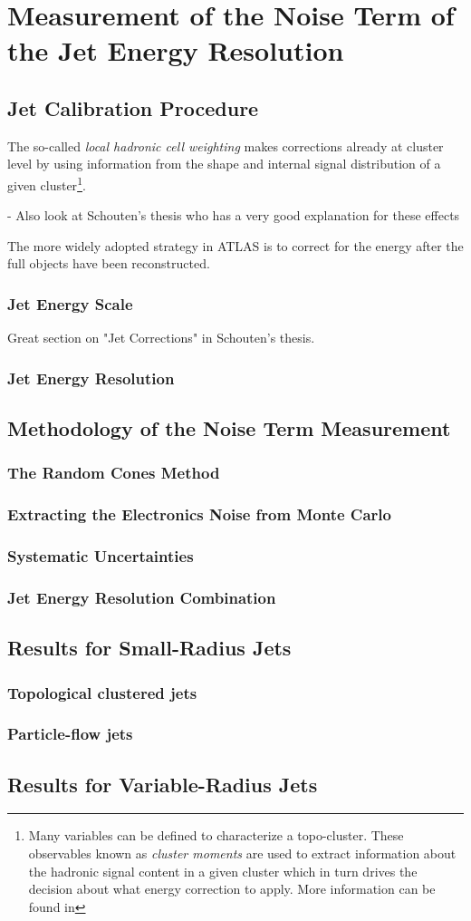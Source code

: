 \chapter{Measurement of the Noise Term of the Jet Energy Resolution}
\label{chap:calibration}

\section{Jet Calibration Procedure}
The so-called \emph{local hadronic cell weighting} makes corrections already at cluster level by using information from the shape and internal signal distribution of a given cluster\footnote{Many variables can be defined to characterize a topo-cluster. These observables known as \emph{cluster moments} are used to extract information about the hadronic signal content in a given cluster which in turn drives the decision about what energy correction to apply. More information can be found in }.

- Also look at Schouten's thesis who has a very good explanation for these effects

The more widely adopted strategy in ATLAS is to correct for the energy after the full objects have been reconstructed.




\subsection{Jet Energy Scale}
Great section on "Jet Corrections" in Schouten's thesis.

\subsection{Jet Energy Resolution}
\section{Methodology of the Noise Term Measurement}
\subsection{The Random Cones Method}
\subsection{Extracting the Electronics Noise from Monte Carlo}
\subsection{Systematic Uncertainties}
\subsection{Jet Energy Resolution Combination}
\section{Results for Small-Radius Jets}
\subsection{Topological clustered jets}
\subsection{Particle-flow jets}
\section{Results for Variable-Radius Jets}
